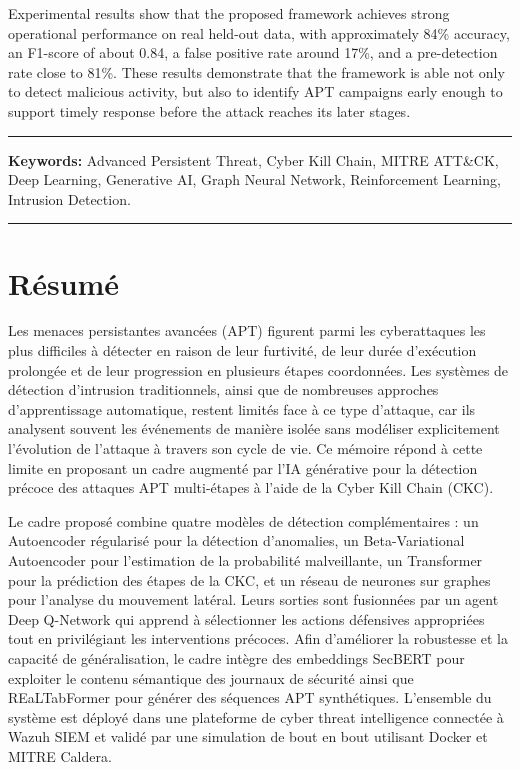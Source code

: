 \documentclass[11pt,a4paper]{report}
\begin{document}
Experimental results show that the proposed framework achieves strong operational performance on real held-out data, with approximately 84\% accuracy, an F1-score of about 0.84, a false positive rate around 17\%, and a pre-detection rate close to 81\%. These results demonstrate that the framework is able not only to detect malicious activity, but also to identify APT campaigns early enough to support timely response before the attack reaches its later stages.

\vspace{0.8em}
\noindent\rule{\linewidth}{0.4pt}

\textbf{Keywords:} Advanced Persistent Threat, Cyber Kill Chain,
MITRE ATT\&CK, Deep Learning, Generative AI, Graph Neural Network,
Reinforcement Learning, Intrusion Detection.

\noindent\rule{\linewidth}{0.4pt}
\vspace{0.8em}

\newpage

\chapter*{Résumé}

Les menaces persistantes avancées (APT) figurent parmi les cyberattaques les plus difficiles à détecter en raison de leur furtivité, de leur durée d’exécution prolongée et de leur progression en plusieurs étapes coordonnées. Les systèmes de détection d’intrusion traditionnels, ainsi que de nombreuses approches d’apprentissage automatique, restent limités face à ce type d’attaque, car ils analysent souvent les événements de manière isolée sans modéliser explicitement l’évolution de l’attaque à travers son cycle de vie. Ce mémoire répond à cette limite en proposant un cadre augmenté par l’IA générative pour la détection précoce des attaques APT multi-étapes à l’aide de la Cyber Kill Chain (CKC).

Le cadre proposé combine quatre modèles de détection complémentaires : un Autoencoder régularisé pour la détection d’anomalies, un Beta-Variational Autoencoder pour l’estimation de la probabilité malveillante, un Transformer pour la prédiction des étapes de la CKC, et un réseau de neurones sur graphes pour l’analyse du mouvement latéral. Leurs sorties sont fusionnées par un agent Deep Q-Network qui apprend à sélectionner les actions défensives appropriées tout en privilégiant les interventions précoces. Afin d’améliorer la robustesse et la capacité de généralisation, le cadre intègre des embeddings SecBERT pour exploiter le contenu sémantique des journaux de sécurité ainsi que REaLTabFormer pour générer des séquences APT synthétiques. L’ensemble du système est déployé dans une plateforme de cyber threat intelligence connectée à Wazuh SIEM et validé par une simulation de bout en bout utilisant Docker et MITRE Caldera.
\end{document}
